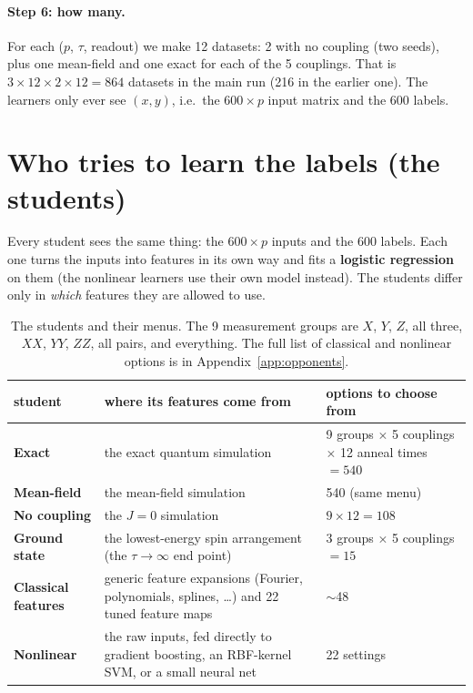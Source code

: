 \documentclass[11pt]{article}
\begin{document}
\paragraph{Step 6: how many.} For each ($p$, $\tau$, readout) we make 12 datasets: 2 with no coupling (two
seeds), plus one mean-field and one exact for each of the 5 couplings. That is
$3\times12\times2\times12=864$ datasets in the main run (216 in the earlier one). The learners only ever see
$(x,y)$, i.e.\ the $600\times p$ input matrix and the 600 labels.

\section{Who tries to learn the labels (the students)}

Every student sees the same thing: the $600\times p$ inputs and the 600 labels. Each one turns the inputs into
features in its own way and fits a \textbf{logistic regression} on them (the nonlinear learners use their own
model instead). The students differ only in \emph{which} features they are allowed to use.

\begin{table}[H]\centering\small
\caption{The students and their menus. The 9 measurement groups are $X$, $Y$, $Z$, all three, $XX$, $YY$,
$ZZ$, all pairs, and everything. The full list of classical and nonlinear options is in
Appendix~\ref{app:opponents}.}\label{tab:students}
\begin{tabular}{@{}p{2.6cm}p{7.6cm}p{3.2cm}@{}}\toprule
student & where its features come from & options to choose from\\\midrule
\textbf{Exact} & the exact quantum simulation & 9 groups $\times$ 5 couplings $\times$ 12 anneal times $=540$\\
\textbf{Mean-field} & the mean-field simulation & 540 (same menu)\\
\textbf{No coupling} & the $J=0$ simulation & $9\times12=108$\\
\textbf{Ground state} & the lowest-energy spin arrangement (the $\tau\to\infty$ end point) & 3 groups $\times$ 5 couplings $=15$\\
\textbf{Classical features} & generic feature expansions (Fourier, polynomials, splines, \ldots) and 22 tuned feature maps & $\sim$48\\
\textbf{Nonlinear} & the raw inputs, fed directly to gradient boosting, an RBF-kernel SVM, or a small neural net & 22 settings\\\bottomrule
\end{tabular}
\end{table}
\end{document}
